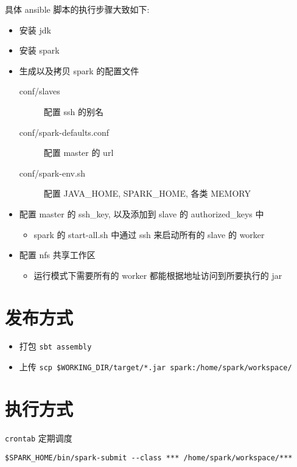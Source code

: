 \documentclass[11pt,a4paper]{article}
\begin{document}
具体 ansible 脚本的执行步骤大致如下:
\begin{itemize}
\item 安装 jdk
\item 安装 spark
\item 生成以及拷贝 spark 的配置文件
\begin{description}
\item[{conf/slaves}] 配置 ssh 的别名
\item[{conf/spark-defaults.conf}] 配置 master 的 url
\item[{conf/spark-env.sh}] 配置 JAVA\_HOME, SPARK\_HOME, 各类 MEMORY
\end{description}
\item 配置 master 的 ssh\_key, 以及添加到 slave 的 authorized\_keys 中
\begin{itemize}
\item spark 的 start-all.sh 中通过 ssh 来启动所有的 slave 的 worker
\end{itemize}
\item 配置 nfs 共享工作区
\begin{itemize}
\item 运行模式下需要所有的 worker 都能根据地址访问到所要执行的 jar
\end{itemize}
\end{itemize}

\section*{发布方式}
\label{sec:org9e566a3}
\begin{itemize}
\item 打包
\texttt{sbt assembly}
\item 上传
\texttt{scp \$WORKING\_DIR/target/*.jar spark:/home/spark/workspace/}
\end{itemize}

\section*{执行方式}
\label{sec:org812e1d6}
\texttt{crontab} 定期调度
\begin{lstlisting}
$SPARK_HOME/bin/spark-submit --class *** /home/spark/workspace/***
\end{lstlisting}
\end{document}

